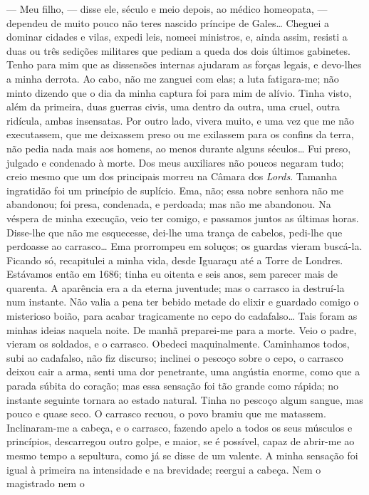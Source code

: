 --- Meu filho, --- disse ele, século e meio depois, ao médico
homeopata, --- dependeu de muito pouco não teres nascido príncipe de
Gales\ldots{} Cheguei a dominar cidades e vilas, expedi leis, nomeei
ministros, e, ainda assim, resisti a duas ou três sedições militares que
pediam a queda dos dois últimos gabinetes. Tenho para mim que as
dissensões internas ajudaram as forças legais, e devo-lhes a minha
derrota. Ao cabo, não me zanguei com elas; a luta fatigara-me; não minto
dizendo que o dia da minha captura foi para mim de alívio. Tinha visto,
além da primeira, duas guerras civis, uma dentro da outra, uma cruel,
outra ridícula, ambas insensatas. Por outro lado, vivera muito, e uma
vez que me não executassem, que me deixassem preso ou me exilassem para
os confins da terra, não pedia nada mais aos homens, ao menos durante
alguns séculos\ldots{} Fui preso, julgado e condenado à morte. Dos meus
auxiliares não poucos negaram tudo; creio mesmo que um dos principais
morreu na Câmara dos \emph{Lords}. Tamanha ingratidão foi um princípio
de suplício. Ema, não; essa nobre senhora não me abandonou; foi presa,
condenada, e perdoada; mas não me abandonou. Na véspera de minha
execução, veio ter comigo, e passamos juntos as últimas horas. Disse-lhe
que não me esquecesse, dei-lhe uma trança de cabelos, pedi-lhe que
perdoasse ao carrasco\ldots{} Ema prorrompeu em soluços; os guardas vieram
buscá-la. Ficando só, recapitulei a minha vida, desde Iguaraçu até a
Torre de Londres. Estávamos então em 1686; tinha eu oitenta e seis anos,
sem parecer mais de quarenta. A aparência era a da eterna juventude; mas
o carrasco ia destruí-la num instante. Não valia a pena ter bebido
metade do elixir e guardado comigo o misterioso boião, para acabar
tragicamente no cepo do cadafalso\ldots{} Tais foram as minhas ideias naquela
noite. De manhã preparei-me para a morte. Veio o padre, vieram os
soldados, e o carrasco. Obedeci maquinalmente. Caminhamos todos, subi ao
cadafalso, não fiz discurso; inclinei o pescoço sobre o cepo, o carrasco
deixou cair a arma, senti uma dor penetrante, uma angústia enorme, como
que a parada súbita do coração; mas essa sensação foi tão grande como
rápida; no instante seguinte tornara ao estado natural. Tinha no pescoço
algum sangue, mas pouco e quase seco. O carrasco recuou, o povo bramiu
que me matassem. Inclinaram-me a cabeça, e o carrasco, fazendo apelo a
todos os seus músculos e princípios, descarregou outro golpe, e maior,
se é possível, capaz de abrir-me ao mesmo tempo a sepultura, como já se
disse de um valente. A minha sensação foi igual à primeira na
intensidade e na brevidade; reergui a cabeça. Nem o magistrado nem o

